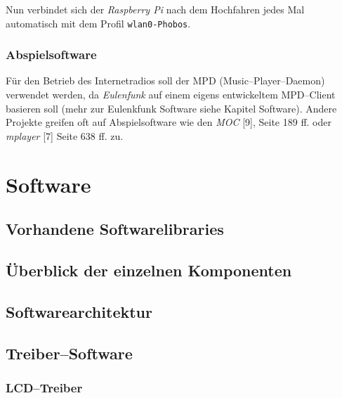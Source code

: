 \documentclass[11pt,ngerman,toc=listof,index=totoc]{scrreprt}
\newenvironment{Shaded}{}{}
\newcommand{\KeywordTok}[1]{\textcolor[rgb]{0.00,0.44,0.13}{\textbf{{#1}}}}
\newcommand{\CommentTok}[1]{\textcolor[rgb]{0.38,0.63,0.69}{\textit{{#1}}}}
\newcommand{\NormalTok}[1]{{#1}}
\begin{document}
Nun verbindet sich der \emph{Raspberry Pi} nach dem Hochfahren jedes Mal
automatisch mit dem Profil \texttt{wlan0-Phobos}.

\subsection{Abspielsoftware}\label{abspielsoftware}

Für den Betrieb des Internetradios soll der MPD (Music--Player--Daemon)
verwendet werden, da \emph{Eulenfunk} auf einem eigens entwickeltem
MPD--Client basieren soll (mehr zur Eulenkfunk Software siehe Kapitel
Software). Andere Projekte greifen oft auf Abspielsoftware wie den
\emph{MOC} {[}9{]}, Seite 189 ff. oder \emph{mplayer} {[}7{]} Seite 638
ff. zu.

\begin{Shaded}
\end{Shaded}

\chapter{Software}\label{software}

\section{Vorhandene
Softwarelibraries}\label{vorhandene-softwarelibraries}

\section{Überblick der einzelnen
Komponenten}\label{uxfcberblick-der-einzelnen-komponenten}

\section{Softwarearchitektur}\label{softwarearchitektur}

\section{Treiber--Software}\label{treibersoftware}

\subsection{LCD--Treiber}\label{lcdtreiber}
\end{document}
